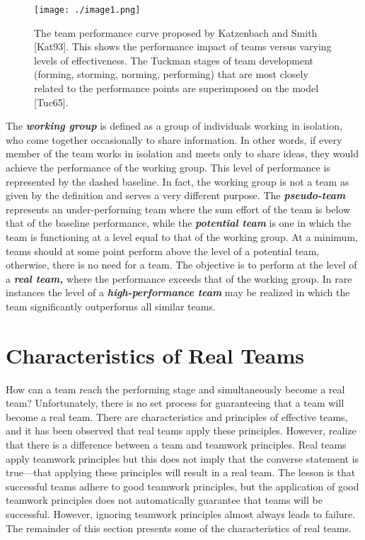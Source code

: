 \begin{figure}[h]
\centering
\texttt{[image: ./image1.png]}
\caption{The team performance curve proposed by Katzenbach
and Smith {[}Kat93{]}. This shows the performance impact of teams versus
varying levels of effectiveness. The Tuckman stages of team development
(forming, storming, norming, performing) that are most closely related
to the performance points are superimposed on the model {[}Tuc65{]}.}
\label{figure:teamPerformance}
\end{figure}

The \emph{\textbf{working group}} is defined as a group of individuals
working in isolation, who come together occasionally to share
information. In other words, if every member of the team works in
isolation and meets only to share ideas, they would achieve the
performance of the working group. This level of performance is
represented by the dashed baseline. In fact, the working group is not a
team as given by the definition and serves a very different purpose. The
\emph{\textbf{pseudo-team}} represents an under-performing team where
the sum effort of the team is below that of the baseline performance,
while the \emph{\textbf{potential team}} is one in which the team is
functioning at a level equal to that of the working group. At a minimum,
teams should at some point perform above the level of a potential team,
otherwise, there is no need for a team. The objective is to perform at
the level of a \emph{\textbf{real team,}} where the performance exceeds
that of the working group. In rare instances the level of a
\emph{\textbf{high-performance team}} may be realized in which the team
significantly outperforms all similar teams.

\section{Characteristics of Real Teams}
\label{setion:characteristics-of-real-teams}

How can a team reach the performing stage and simultaneously become a
real team? Unfortunately, there is no set process for guaranteeing that
a team will become a real team. There are characteristics and principles
of effective teams, and it has been observed that real teams apply these
principles. However, realize that there is a difference between a team
and teamwork principles. Real teams apply teamwork principles but this
does not imply that the converse statement is true---that applying these
principles will result in a real team. The lesson is that successful
teams adhere to good teamwork principles, but the application of good
teamwork principles does not automatically guarantee that teams will be
successful. However, ignoring teamwork principles almost always leads to
failure. The remainder of this section presents some of the
characteristics of real teams.

